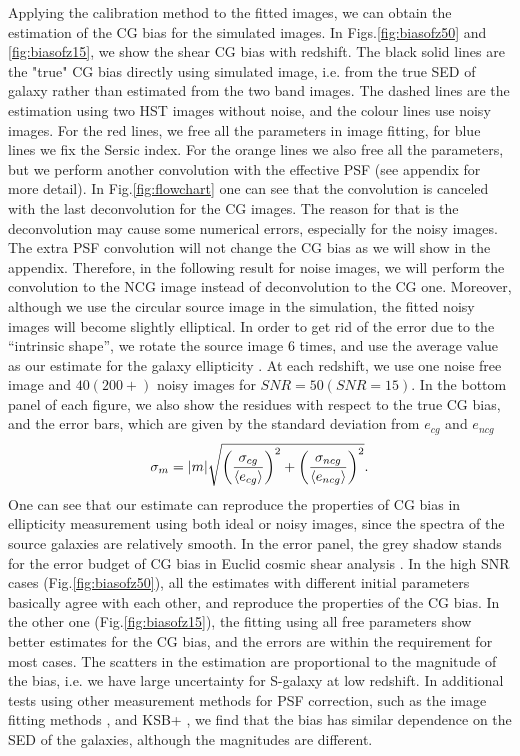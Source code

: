 \documentclass[useAMS,usenatbib]{mn2e}
\newcommand{\be}{\begin{equation}}
\newcommand{\ee}{\end{equation}}
\newcommand{\rund}[1]{\left(#1\right)}
\def\elabel#1{\label{eq:#1}}
\begin{document}
Applying the calibration method to the fitted images, we can obtain
the estimation of the CG bias for the simulated images. In
Figs.\ref{fig:biasofz50} and \ref{fig:biasofz15}, we show the shear CG
bias with redshift. The black solid lines are the "true" CG bias
directly using simulated image, i.e. from the true SED of galaxy
rather than estimated from the two band images. The dashed lines are
the estimation using two HST images without noise, and the colour
lines use noisy images. For the red lines, we free all the parameters
in image fitting, for blue lines we fix the Sersic index. For the
orange lines we also free all the parameters, but we perform another
convolution with the effective PSF (see appendix for more detail).  In
Fig.\ref{fig:flowchart} one can see that the convolution is canceled
with the last deconvolution for the CG images. The reason for that is
the deconvolution may cause some numerical errors, especially for the
noisy images. The extra PSF convolution will not change the CG bias as
we will show in the appendix. Therefore, in the following result for
noise images, we will perform the convolution to the NCG image instead
of deconvolution to the CG one.
%
Moreover, although we use the circular source image in the simulation,
the fitted noisy images will become slightly elliptical. In order to
get rid of the error due to the ``intrinsic shape'', we rotate the
source image $6$ times, and use the average value as our estimate for
the galaxy ellipticity \citep{2007AJ....133.1763N}. At each redshift,
we use one noise free image and $40 (200+)$ noisy images for $SNR=50
(SNR=15)$.  In the bottom panel of each figure, we also show the
residues with respect to the true CG bias, and the error bars, which
are given by the standard deviation from $e_{cg}$ and $e_{ncg}$
%
\be
\sigma_m= |m| \sqrt{\rund{\sigma_{cg} \over \langle e_{cg}\rangle }^2
  + \rund{\sigma_{ncg} \over \langle e_{ncg} \rangle}^2 }.
\elabel{sigmam}
\ee
%
One can see that our estimate can reproduce the properties of CG bias
in ellipticity measurement using both ideal or noisy images, since the
spectra of the source galaxies are relatively smooth. In the error
panel, the grey shadow stands for the error budget of CG bias in
Euclid cosmic shear analysis \citep[$\pm
  0.00025$][]{2013MNRAS.431.3103C,2013MNRAS.429..661M}. In the high
SNR cases (Fig.\ref{fig:biasofz50}), all the estimates with different
initial parameters basically agree with each other, and reproduce the
properties of the CG bias. In the other one (Fig.\ref{fig:biasofz15}),
the fitting using all free parameters show better estimates for the CG
bias, and the errors are within the requirement for most cases. The
scatters in the estimation are proportional to the magnitude of the
bias, i.e. we have large uncertainty for S-galaxy at low redshift.
In additional tests using other measurement methods for PSF
correction, such as the image fitting methods
\citep[e.g.][]{2007MNRAS.382..315M,2008MNRAS.390..149K,2013MNRAS.429.2858M},
and KSB+ \citep[e.g.][]{1998ApJ...504..636H,2006MNRAS.368.1323H}, we
find that the bias has similar dependence on the SED of the galaxies, 
although the magnitudes are different.
\end{document}
